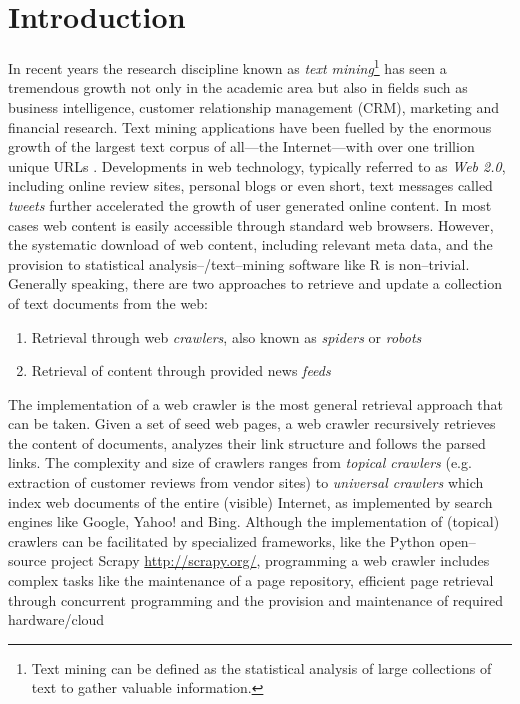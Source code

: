 \documentclass[a4paper]{article}
\newcommand{\pkg}[1]{{\normalfont\fontseries{b}\selectfont #1}}
\newcommand{\proglang}[1]{\textsf{#1}}
\begin{document}
\section{Introduction}
In recent years the research discipline known as \textit{text mining}\footnote{Text
mining can be defined as the statistical analysis of large collections of text
to gather valuable information.} has seen a tremendous growth not only in the
academic area but also in fields such as business intelligence, customer
relationship management (CRM), marketing and financial research. Text mining
applications have been fuelled by the enormous growth of the largest text
corpus of all---the Internet---with over one trillion unique URLs \citep{AlpertHajaj:GoogleBigWeb}.
Developments in web technology, typically referred to as \textit{Web 2.0},
including online review sites, personal blogs or even short, text messages
called \textit{tweets} further accelerated the growth of user generated online
content. In most cases web content is easily accessible through standard web browsers.
However, the systematic download of web content, including relevant
meta data, and the provision to statistical analysis--/text--mining software
like \proglang{R} is non--trivial. Generally speaking, there are two
approaches to retrieve and update a collection of text documents from the web:
\begin{enumerate}
\item Retrieval through web \textit{crawlers}, also known as
\textit{spiders} or \textit{robots}
\item Retrieval of content through provided news \textit{feeds} 
\end{enumerate}
The implementation of a web crawler is the most general retrieval
approach that can be taken. Given a set of seed web pages, a web crawler
recursively retrieves the content of documents, analyzes their link structure
and follows the parsed links. The complexity and size of crawlers ranges from
\textit{topical crawlers} (e.g. extraction of customer reviews from vendor
sites) to \textit{universal crawlers} which index web documents of the entire
(visible) Internet, as implemented by search engines like Google, Yahoo! and
Bing. Although the implementation of (topical) crawlers can be facilitated by
specialized  frameworks, like the \proglang{Python} open--source project
\pkg{Scrapy} \url{http://scrapy.org/}, programming a web crawler includes complex tasks like the
maintenance of a page repository, efficient page retrieval through concurrent
programming and the provision and maintenance of required hardware/cloud
\end{document}
